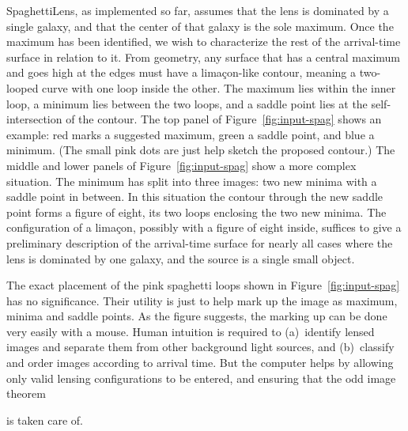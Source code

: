 \documentclass[12pt,preprint]{aastex}
\newcommand{\spl}{SpaghettiLens\xspace}
\newcommand{\figref}[1]{Figure~\ref{fig:#1}}
\newcommand{\Figref}[1]{Figure~\ref{fig:#1}}
\newcommand{\todo}[2][red]{%

\textcolor{#1}{\textbullet}%
\marginpar{\colorbox{#1}{\parbox{\marginparwidth}{%
\setstretch{0.4}\sffamily\textcolor{black}{\scriptsize{#2}}}}}}
\newcommand{\needcite}[1][]{\todo[green]{cit #1}}
\begin{document}
\spl, as implemented so far, assumes that the lens is dominated by a
single galaxy, and that the center of that galaxy is the sole maximum.
Once the maximum has been identified, we wish to characterize the rest
of the arrival-time surface in relation to it.  From geometry, any
surface that has a central maximum and goes high at the edges must
have a lima\c con-like contour, meaning a two-looped curve with one
loop inside the other.  The maximum lies within the inner loop, a
minimum lies between the two loops, and a saddle point lies at the
self-intersection of the contour.  The top panel of
\figref{input-spag} shows an example: red marks a suggested
maximum, green a saddle point, and blue a minimum.  (The small pink
dots are just help sketch the proposed contour.)  The middle and lower
panels of \figref{input-spag} show a more complex situation.
The minimum has split into three images: two new minima with a saddle
point in between.  In this situation the contour through the new
saddle point forms a figure of eight, its two loops enclosing the two
new minima.  The configuration of a lima\c con, possibly with a figure
of eight inside, suffices to give a preliminary description of the
arrival-time surface for nearly all cases where the lens is dominated
by one galaxy, and the source is a single small object.

The exact placement of the pink spaghetti loops shown in
\Figref{input-spag} has no significance.  Their utility is
just to help mark up the image as maximum, minima and saddle points.
As the figure suggests, the marking up can be done very easily with a
mouse.  Human intuition is required to (a)~identify lensed images and
separate them from other background light sources, and (b)~classify
and order images according to arrival time.  But the computer helps by
allowing only valid lensing configurations to be entered, and ensuring
that the odd image theorem\needcite is taken care of.
\end{document}
